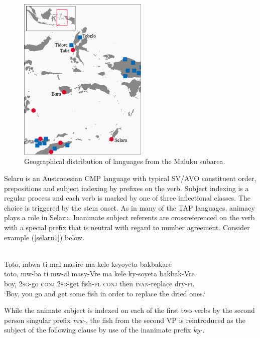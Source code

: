 \begin{figure}

\includegraphics[width=0.55\textwidth]{figures/Map_Maluku2.eps}
\caption{Geographical distribution of languages from the Maluku subarea.}\label{map:Mal}

\end{figure}

Selaru is an Austronesian CMP language with typical SV/AVO constituent order, prepositions and subject indexing by prefixes on the verb. Subject indexing is a regular process and each verb is marked by one of three inflectional classes. The choice is triggered by the stem onset. As in many of the TAP languages, animacy plays a role in Selaru. Inanimate subject referents are crossreferenced on the verb with a special prefix that is neutral with regard to number agreement. Consider example (\ref{selaru1}) below.

\ea \label{selaru1}
\\
\glll Toto, mbwa ti mal masire ma kele ksyoyeta bakbakare\\
toto, mw-ba ti mw-al masy-Vre ma kele ky-soyeta bakbak-Vre\\
boy, \textsc{2}\textsc{sg}-go \textsc{conj} \textsc{2}\textsc{sg}-get fish-\textsc{pl} \textsc{conj} then \textsc{inan}-replace dry-\textsc{pl} \\
\glft `Boy, you go and get some fish in order to replace the dried ones.‘
\z

While the animate subject is indexed on each of the first two verbs by the second person singular prefix \textit{mw-}, the fish from the second VP is reintroduced as the subject of the following clause by use of the inanimate prefix \textit{ky-}. 

